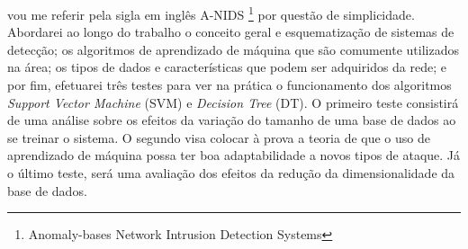  vou me referir pela sigla em inglês A-NIDS \footnote{Anomaly-bases Network Intrusion Detection Systems} por questão de
 simplicidade. Abordarei ao longo do trabalho o conceito geral e esquematização de sistemas de detecção; os algoritmos
 de aprendizado de máquina que são comumente utilizados na área; os tipos de dados e características que podem ser
 adquiridos da rede; e por fim, efetuarei três testes para ver na prática o funcionamento dos algoritmos \emph{Support Vector
 Machine} (SVM) e \emph{Decision Tree} (DT). O primeiro teste consistirá de uma análise sobre os efeitos da variação do
 tamanho de uma base de dados ao se treinar o sistema. O segundo visa colocar à prova a teoria de que o uso de aprendizado
 de máquina possa ter boa adaptabilidade a novos tipos de ataque. Já o último teste, será uma avaliação dos efeitos da
 redução da dimensionalidade da base de dados.